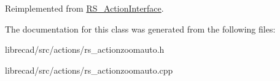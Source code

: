 Reimplemented from \hyperlink{classRS__ActionInterface_aa2ba8f6f697f735eace4ec5449c0b8cd}{R\-S\-\_\-\-Action\-Interface}.



The documentation for this class was generated from the following files\-:\begin{DoxyCompactItemize}
\item 
librecad/src/actions/rs\-\_\-actionzoomauto.\-h\item 
librecad/src/actions/rs\-\_\-actionzoomauto.\-cpp\end{DoxyCompactItemize}
